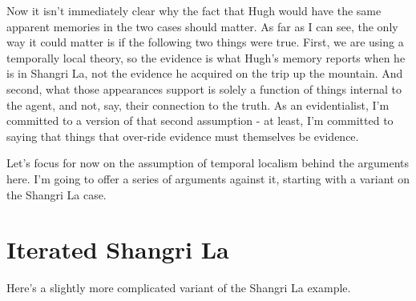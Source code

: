 \documentclass[
  10pt,
  letterpaper,
  DIV=11,
  numbers=noendperiod,
  twoside]{scrartcl}
\begin{document}
Now it isn't immediately clear why the fact that Hugh would have the
same apparent memories in the two cases should matter. As far as I can
see, the only way it could matter is if the following two things were
true. First, we are using a temporally local theory, so the evidence is
what Hugh's memory reports when he is in Shangri La, not the evidence he
acquired on the trip up the mountain. And second, what those appearances
support is solely a function of things internal to the agent, and not,
say, their connection to the truth. As an evidentialist, I'm committed
to a version of that second assumption - at least, I'm committed to
saying that things that over-ride evidence must themselves be evidence.

Let's focus for now on the assumption of temporal localism behind the
arguments here. I'm going to offer a series of arguments against it,
starting with a variant on the Shangri La case.

\section{Iterated Shangri La}\label{iteratedshangrila}

Here's a slightly more complicated variant of the Shangri La example.
\end{document}
